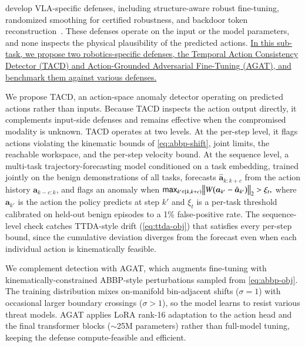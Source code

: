 develop VLA-specific defenses, including structure-aware robust fine-tuning, randomized smoothing for certified robustness, and backdoor token reconstruction~\cite{zhang2026structure,seferis2025randomized,li2026whenattention}. These defenses operate on the input or the model parameters, and none inspects the physical plausibility of the predicted actions.
{\ul{In this sub-task, we propose two robotics-specific defenses, the Temporal Action Consistency Detector (TACD) and Action-Grounded Adversarial Fine-Tuning (AGAT), and benchmark them against various defenses.}}

 We propose TACD, an action-space anomaly detector operating on predicted actions rather than inputs. Because TACD inspects the action output directly, it complements input-side defenses and remains effective when the compromised modality is unknown. TACD operates at two levels. At the per-step level, it flags actions violating the kinematic bounds of \autoref{eq:abbp-shift}, \ie joint limits, the reachable workspace, and the per-step velocity bound. At the sequence level, a multi-task trajectory-forecasting model conditioned on a task embedding, trained jointly on the benign demonstrations of all tasks, forecasts $\hat{\bm{a}}_{k:k+c}$ from the action history $\bm{a}_{k-c:k}$, and flags an anomaly when
$
{\sf{max}}_{k'\in[k,k+c)} \bigl\|W\bigl(\bm{a}_{k'}-\hat{\bm{a}}_{k'}\bigr)\bigr\|_{2} > \xi_t,
$
where $\bm{a}_{k'}$ is the action the policy predicts at step $k'$ and $\xi_t$ is a per-task threshold calibrated on held-out benign episodes to a 1\% false-positive rate. The sequence-level check catches TTDA-style drift (\autoref{eq:ttda-obj}) that satisfies every per-step bound, since the cumulative deviation diverges from the forecast even when each individual action is kinematically feasible.

 We complement detection with AGAT, which augments fine-tuning with kinematically-constrained ABBP-style perturbations sampled from \autoref{eq:abbp-obj}. The training distribution mixes on-manifold bin-adjacent shifts ($\sigma{=}1$) with occasional larger boundary crossings ($\sigma{>}1$), so the model learns to resist various threat models. AGAT applies LoRA rank-16 adaptation to the action head and the final transformer blocks ($\sim$25M parameters) rather than full-model tuning, keeping the defense compute-feasible and efficient.

